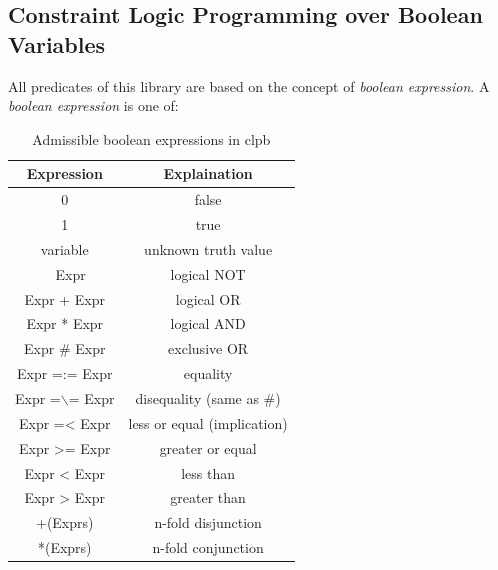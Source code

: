 \subsection{Constraint Logic Programming over Boolean Variables}\label{subsec:clpb}

All predicates of this library are based on the concept of \textit{boolean expression}. A \textit{boolean expression} is one of:
\begin{center}
    \begin{table}
        \begin{tabular}{||c c ||} 
        \hline
        Expression & Explaination \\ [0.5ex] 
        \hline\hline
        0 & false \\
        \hline
        1 & true \\ 
        \hline
        variable & unknown truth value \\
        \hline
        ~ Expr & logical NOT\\
        \hline
        Expr + Expr & logical OR \\
        \hline
        Expr * Expr & logical AND \\
        \hline
        Expr \# Expr & exclusive OR \\
        \hline
        Expr =:= Expr & equality \\
        \hline
        Expr =$\backslash$= Expr & disequality (same as \#) \\
        \hline
        Expr =< Expr & less or equal (implication) \\
        \hline
        Expr >= Expr & greater or equal \\
        \hline
        Expr < Expr	& less than\\
        \hline
        Expr > Expr	& greater than \\
        \hline
        +(Exprs) & n-fold disjunction \\
        \hline
        *(Exprs) & n-fold conjunction \\
        \hline
        \end{tabular}
        \label{table:boolean_expressions}
        \caption{Admissible boolean expressions in clpb}
    \end{table}    
\end{center}

